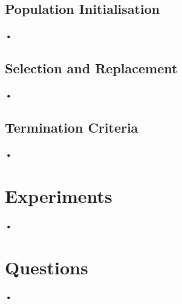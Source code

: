 \documentclass[10pt]{article}
\begin{document}
\subsection{Population Initialisation}
\paragraph{•}
\subsection{Selection and Replacement}
\paragraph{•}
\subsection{Termination Criteria}
\paragraph{•}
\section{Experiments}
\paragraph{•}
\section{Questions}
\paragraph{•}
\end{document}
